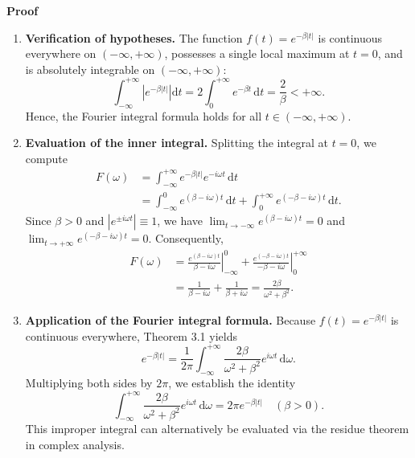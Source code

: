 \documentclass[11pt,a4paper]{article}
\theoremstyle{definition}
\theoremstyle{plain}
\begin{document}
\textbf{Proof}\par\nopagebreak[4]
\begin{enumerate}
\item \textbf{Verification of hypotheses.} The function $f(t) = e^{-\beta |t|}$ is continuous everywhere on $(-\infty, +\infty)$, possesses a single local maximum at $t = 0$, and is absolutely integrable on $(-\infty, +\infty)$:
\begin{equation}
\int_{-\infty}^{+\infty} \left| e^{-\beta |t|} \right| \mathrm{d}t = 2 \int_{0}^{+\infty} e^{-\beta t} \, \mathrm{d}t = \frac{2}{\beta} < +\infty.
\end{equation}
Hence, the Fourier integral formula holds for all $t \in (-\infty, +\infty)$.

\item \textbf{Evaluation of the inner integral.} Splitting the integral at $t = 0$, we compute
\begin{align*}
F(\omega) &= \int_{-\infty}^{+\infty} e^{-\beta |t|} e^{-i\omega t} \, \mathrm{d}t \\
&= \int_{-\infty}^{0} e^{(\beta - i\omega)t} \, \mathrm{d}t + \int_{0}^{+\infty} e^{(-\beta - i\omega)t} \, \mathrm{d}t.
\end{align*}
Since $\beta > 0$ and $\left| e^{\pm i\omega t} \right| \equiv 1$, we have $\lim_{t \to -\infty} e^{(\beta - i\omega)t} = 0$ and $\lim_{t \to +\infty} e^{(-\beta - i\omega)t} = 0$. Consequently,
\begin{align*}
F(\omega) &= \left. \frac{e^{(\beta - i\omega)t}}{\beta - i\omega} \right|_{-\infty}^{0} + \left. \frac{e^{(-\beta - i\omega)t}}{-\beta - i\omega} \right|_{0}^{+\infty} \\
&= \frac{1}{\beta - i\omega} + \frac{1}{\beta + i\omega} = \frac{2\beta}{\omega^2 + \beta^2}.
\end{align*}

\item \textbf{Application of the Fourier integral formula.} Because $f(t) = e^{-\beta |t|}$ is continuous everywhere, Theorem 3.1 yields
\begin{equation}
e^{-\beta |t|} = \frac{1}{2\pi} \int_{-\infty}^{+\infty} \frac{2\beta}{\omega^2 + \beta^2} e^{i\omega t} \, \mathrm{d}\omega.
\end{equation}
Multiplying both sides by $2\pi$, we establish the identity
\begin{equation}
\int_{-\infty}^{+\infty} \frac{2\beta}{\omega^2 + \beta^2} e^{i\omega t} \, \mathrm{d}\omega = 2\pi e^{-\beta |t|} \quad (\beta > 0).
\end{equation}
This improper integral can alternatively be evaluated via the residue theorem in complex analysis.
\end{enumerate}
\end{document}
